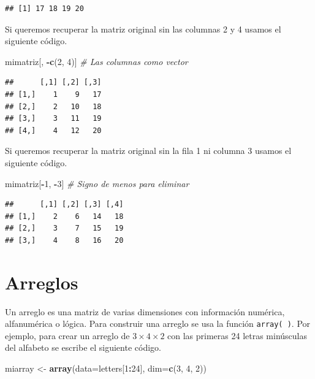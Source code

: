 \documentclass[10pt,]{krantz}
\makeatletter
\newenvironment{Shaded}{\begin{snugshade}}{\end{snugshade}}
\newcommand{\KeywordTok}[1]{\textcolor[rgb]{0.13,0.29,0.53}{\textbf{#1}}}
\newcommand{\DataTypeTok}[1]{\textcolor[rgb]{0.13,0.29,0.53}{#1}}
\newcommand{\DecValTok}[1]{\textcolor[rgb]{0.00,0.00,0.81}{#1}}
\newcommand{\StringTok}[1]{\textcolor[rgb]{0.31,0.60,0.02}{#1}}
\newcommand{\CommentTok}[1]{\textcolor[rgb]{0.56,0.35,0.01}{\textit{#1}}}
\newcommand{\OperatorTok}[1]{\textcolor[rgb]{0.81,0.36,0.00}{\textbf{#1}}}
\newcommand{\NormalTok}[1]{#1}
\newenvironment{kframe}{%
\medskip{}
\setlength{\fboxsep}{.8em}
 \def\at@end@of@kframe{}%
 \ifinner\ifhmode%
  \def\at@end@of@kframe{\end{minipage}}%
  \begin{minipage}{\columnwidth}%
 \fi\fi%
 \def\FrameCommand##1{\hskip\@totalleftmargin \hskip-\fboxsep
 \colorbox{shadecolor}{##1}\hskip-\fboxsep
     \hskip-\linewidth \hskip-\@totalleftmargin \hskip\columnwidth}%
 \MakeFramed {\advance\hsize-\width
   \@totalleftmargin\z@ \linewidth\hsize
   \@setminipage}}%
 {\par\unskip\endMakeFramed%
 \at@end@of@kframe}
\renewenvironment{Shaded}{\begin{kframe}}{\end{kframe}}
\makeatother
\begin{document}
\begin{verbatim}
## [1] 17 18 19 20
\end{verbatim}

Si queremos recuperar la matriz original sin las columnas 2 y 4 usamos
el siguiente código.

\begin{Shaded}
\begin{Highlighting}[]
\NormalTok{mimatriz[, }\OperatorTok{-}\KeywordTok{c}\NormalTok{(}\DecValTok{2}\NormalTok{, }\DecValTok{4}\NormalTok{)]  }\CommentTok{# Las columnas como vector}
\end{Highlighting}
\end{Shaded}

\begin{verbatim}
##      [,1] [,2] [,3]
## [1,]    1    9   17
## [2,]    2   10   18
## [3,]    3   11   19
## [4,]    4   12   20
\end{verbatim}

Si queremos recuperar la matriz original sin la fila 1 ni columna 3
usamos el siguiente código.

\begin{Shaded}
\begin{Highlighting}[]
\NormalTok{mimatriz[}\OperatorTok{-}\DecValTok{1}\NormalTok{, }\OperatorTok{-}\DecValTok{3}\NormalTok{]  }\CommentTok{# Signo de menos para eliminar}
\end{Highlighting}
\end{Shaded}

\begin{verbatim}
##      [,1] [,2] [,3] [,4]
## [1,]    2    6   14   18
## [2,]    3    7   15   19
## [3,]    4    8   16   20
\end{verbatim}

\section{\texorpdfstring{Arreglos 
}{Arreglos  }}\label{arreglos}

Un arreglo es una matriz de varias dimensiones con información numérica,
alfanumérica o lógica. Para construir una arreglo se usa la función
\texttt{array(\ )}. Por ejemplo, para crear un arreglo de
\(3 \times 4 \times 2\) con las primeras 24 letras minúsculas del
alfabeto se escribe el siguiente código.

\begin{Shaded}
\begin{Highlighting}[]
\NormalTok{miarray <-}\StringTok{ }\KeywordTok{array}\NormalTok{(}\DataTypeTok{data=}\NormalTok{letters[}\DecValTok{1}\OperatorTok{:}\DecValTok{24}\NormalTok{], }\DataTypeTok{dim=}\KeywordTok{c}\NormalTok{(}\DecValTok{3}\NormalTok{, }\DecValTok{4}\NormalTok{, }\DecValTok{2}\NormalTok{))}
\end{Highlighting}
\end{Shaded}
\end{document}
